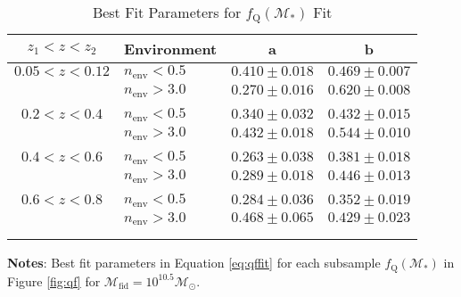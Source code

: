 \documentclass{aastex}
\def \lowenvthresh {0.5}
\def \highenvthresh {3.0}
\begin{document}
\begin{table} 
  \caption{Best Fit Parameters for $f_{\mathrm{Q}}(\mathcal{M}_{*})$ Fit}
  \label{tab:bestfitparam}
  \begin{center}
    \leavevmode
    \begin{tabular}{clcc} \hline \hline              
    $z_1 < z < z_2$ &Environment        &a  &b  \\ \hline 
$0.05 < z< 0.12$ &$n_{\mathrm{env}} < \lowenvthresh$ & $0.410 \pm 0.018$ & $0.469 \pm 0.007$ \\
               &$n_{\mathrm{env}} > \highenvthresh$ & $0.270 \pm 0.016$ & $0.620 \pm 0.008$ \\ 
                              &               &                       &                           \\ \hline   
$0.2 < z <0.4$ & $n_{\mathrm{env}} < \lowenvthresh$ & $0.340 \pm 0.032$ & $0.432 \pm 0.015$ \\
               &$n_{\mathrm{env}} > \highenvthresh$ & $0.432 \pm 0.018$ & $0.544 \pm 0.010$ \\
               &               &                       &                           \\ \hline
$0.4 < z < 0.6$      &$n_{\mathrm{env}} < \lowenvthresh$ & $0.263 \pm 0.038$ & $0.381 \pm 0.018$ \\
               &$n_{\mathrm{env}} > \highenvthresh$ & $0.289 \pm 0.018$ & $0.446 \pm 0.013$ \\
               &               &                       &                           \\ \hline
$0.6 < z < 0.8$      &$n_{\mathrm{env}} < \lowenvthresh$ & $0.284 \pm 0.036$ & $0.352 \pm 0.019$ \\
               &$n_{\mathrm{env}} > \highenvthresh$            & $0.468 \pm 0.065$ & $0.429 \pm 0.023$ \\
               &               &                       &                           \\ \hline
  \multicolumn{4}{l}{}                                             \\       
    \end{tabular} \par
    \end{center}
    {\bf Notes}: Best fit parameters in Equation \ref{eq:qffit} for each subsample $f_{\mathrm{Q}}(\mathcal{M}_{*})$ in Figure \ref{fig:qf} for $\mathcal{M}_{\mathrm{fid}} = 10^{10.5} \mathcal{M}_{\odot}$.
\end{table}
\end{document}
